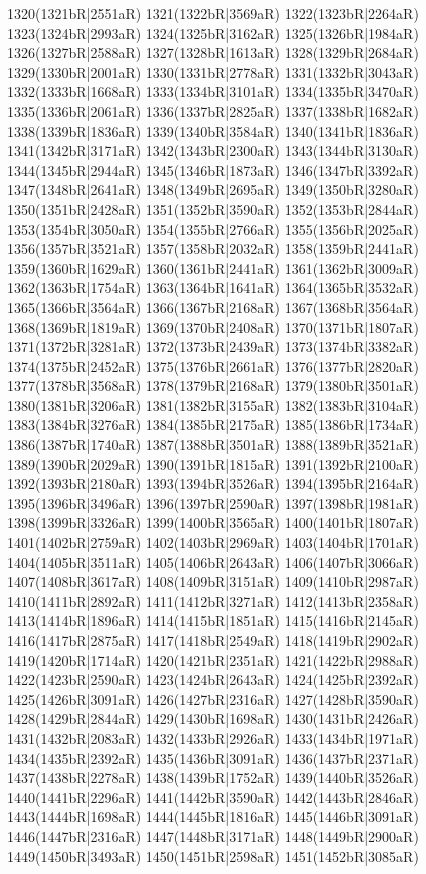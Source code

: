 1320(1321bR|2551aR) 1321(1322bR|3569aR) 1322(1323bR|2264aR) \\1323(1324bR|2993aR) 1324(1325bR|3162aR) 1325(1326bR|1984aR) 1326(1327bR|2588aR) 1327(1328bR|1613aR) 1328(1329bR|2684aR) 1329(1330bR|2001aR) 1330(1331bR|2778aR) 1331(1332bR|3043aR) \\1332(1333bR|1668aR) 1333(1334bR|3101aR) 1334(1335bR|3470aR) 1335(1336bR|2061aR) 1336(1337bR|2825aR) 1337(1338bR|1682aR) 1338(1339bR|1836aR) 1339(1340bR|3584aR) 1340(1341bR|1836aR) \\1341(1342bR|3171aR) 1342(1343bR|2300aR) 1343(1344bR|3130aR) 1344(1345bR|2944aR) 1345(1346bR|1873aR) 1346(1347bR|3392aR) 1347(1348bR|2641aR) 1348(1349bR|2695aR) 1349(1350bR|3280aR) \\1350(1351bR|2428aR) 1351(1352bR|3590aR) 1352(1353bR|2844aR) 1353(1354bR|3050aR) 1354(1355bR|2766aR) 1355(1356bR|2025aR) 1356(1357bR|3521aR) 1357(1358bR|2032aR) 1358(1359bR|2441aR) \\1359(1360bR|1629aR) 1360(1361bR|2441aR) 1361(1362bR|3009aR) 1362(1363bR|1754aR) 1363(1364bR|1641aR) 1364(1365bR|3532aR) 1365(1366bR|3564aR) 1366(1367bR|2168aR) 1367(1368bR|3564aR) \\1368(1369bR|1819aR) 1369(1370bR|2408aR) 1370(1371bR|1807aR) 1371(1372bR|3281aR) 1372(1373bR|2439aR) 1373(1374bR|3382aR) 1374(1375bR|2452aR) 1375(1376bR|2661aR) 1376(1377bR|2820aR) \\1377(1378bR|3568aR) 1378(1379bR|2168aR) 1379(1380bR|3501aR) 1380(1381bR|3206aR) 1381(1382bR|3155aR) 1382(1383bR|3104aR) 1383(1384bR|3276aR) 1384(1385bR|2175aR) 1385(1386bR|1734aR) \\1386(1387bR|1740aR) 1387(1388bR|3501aR) 1388(1389bR|3521aR) 1389(1390bR|2029aR) 1390(1391bR|1815aR) 1391(1392bR|2100aR) 1392(1393bR|2180aR) 1393(1394bR|3526aR) 1394(1395bR|2164aR) \\1395(1396bR|3496aR) 1396(1397bR|2590aR) 1397(1398bR|1981aR) 1398(1399bR|3326aR) 1399(1400bR|3565aR) 1400(1401bR|1807aR) 1401(1402bR|2759aR) 1402(1403bR|2969aR) 1403(1404bR|1701aR) \\1404(1405bR|3511aR) 1405(1406bR|2643aR) 1406(1407bR|3066aR) 1407(1408bR|3617aR) 1408(1409bR|3151aR) 1409(1410bR|2987aR) 1410(1411bR|2892aR) 1411(1412bR|3271aR) 1412(1413bR|2358aR) \\1413(1414bR|1896aR) 1414(1415bR|1851aR) 1415(1416bR|2145aR) 1416(1417bR|2875aR) 1417(1418bR|2549aR) 1418(1419bR|2902aR) 1419(1420bR|1714aR) 1420(1421bR|2351aR) 1421(1422bR|2988aR) \\1422(1423bR|2590aR) 1423(1424bR|2643aR) 1424(1425bR|2392aR) 1425(1426bR|3091aR) 1426(1427bR|2316aR) 1427(1428bR|3590aR) 1428(1429bR|2844aR) 1429(1430bR|1698aR) 1430(1431bR|2426aR) \\1431(1432bR|2083aR) 1432(1433bR|2926aR) 1433(1434bR|1971aR) 1434(1435bR|2392aR) 1435(1436bR|3091aR) 1436(1437bR|2371aR) 1437(1438bR|2278aR) 1438(1439bR|1752aR) 1439(1440bR|3526aR) \\1440(1441bR|2296aR) 1441(1442bR|3590aR) 1442(1443bR|2846aR) 1443(1444bR|1698aR) 1444(1445bR|1816aR) 1445(1446bR|3091aR) 1446(1447bR|2316aR) 1447(1448bR|3171aR) 1448(1449bR|2900aR) \\1449(1450bR|3493aR) 1450(1451bR|2598aR) 1451(1452bR|3085aR) 